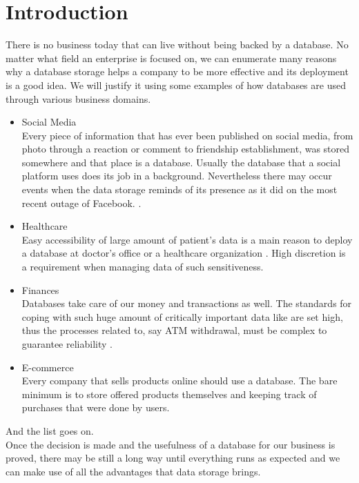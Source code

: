 \chapter{Introduction}

There is no business today that can live without being backed by a database.
No matter what field an enterprise is focused on, we can enumerate many reasons why a database storage helps a company to be more effective and its deployment is a good idea.
We will justify it using some examples of how databases are used through various business domains.

\begin{itemize}
	
	\item Social Media \\
	Every piece of information that has ever been published on social media, from photo through a reaction or comment to friendship establishment, was stored somewhere and that place is a database. Usually the database that a social platform uses does its job in a background. Nevertheless there may occur events when the data storage reminds of its presence as it did on the most recent outage of Facebook. \cite{Facebook19}.
	
	\item Healthcare \\
	Easy accessibility of large amount of patient's data is a main reason to deploy a database at doctor's office or a healthcare organization \cite{Healthcare13}. High discretion is a requirement when managing data of such sensitiveness.
	
	\item Finances \\
	Databases take care of our money and transactions as well. The standards for coping with such huge amount of critically important data like are set high, thus the processes related to, say ATM withdrawal, must be complex to guarantee reliability \cite{BanksCaixa}.
	
	\item E-commerce \\
	Every company that sells products online should use a database. The bare minimum is to store offered products themselves and keeping track of purchases that were done by users.
\end{itemize}
And the list goes on.
\\

Once the decision is made and the usefulness of a database for our business is proved, there may be still a long way until everything runs as expected and we can make use of all the advantages that data storage brings.

